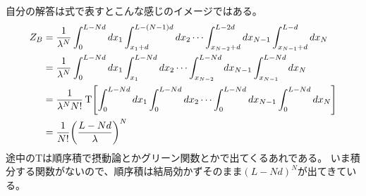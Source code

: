 \documentclass[../ap_2012.tex]{subfiles}
\begin{document}
自分の解答は式で表すとこんな感じのイメージではある。
\begin{equation*}\begin{aligned}[b]
    Z_B &= \frac{1}{\lambda^N}\int_0^{L-Nd}dx_1\int_{x_1+d}^{L-(N-1)d}dx_2\cdots\int_{x_{N-2}+d}^{L-2d}dx_{N-1}\int_{x_{N-1}+d}^{L-d}dx_N\\
    &=\frac{1}{\lambda^N}\int_0^{L-Nd}dx_1\int_{x_1}^{L-Nd}dx_2\cdots\int_{x_{N-2}}^{L-Nd}dx_{N-1}\int_{x_{N-1}}^{L-Nd}dx_N\\
    &=\frac{1}{\lambda^N N!}\,\mathrm{T}\qty[\int_0^{L-Nd}dx_1\int_{0}^{L-Nd}dx_2\cdots\int_{0}^{L-Nd}dx_{N-1}\int_{0}^{L-Nd}dx_N]\\
    &= \frac{1}{N!}\qty(\frac{L-Nd}{\lambda})^N
\end{aligned}\end{equation*}
途中の\(\mathrm{T}\)は順序積で摂動論とかグリーン関数とかで出てくるあれである。
いま積分する関数がないので、順序積は結局効かずそのまま\((L-Nd)^N\)が出てきている。
\end{document}

